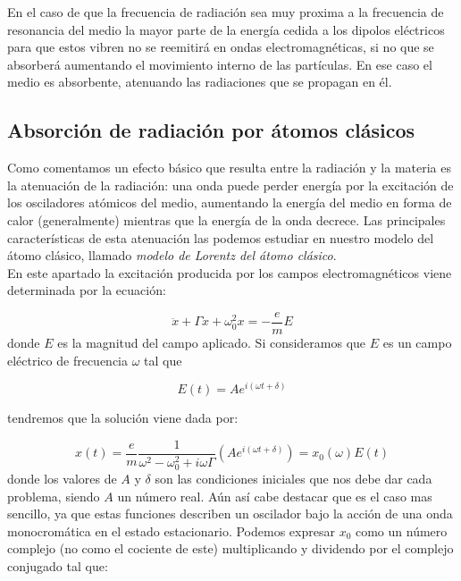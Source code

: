 \documentclass[12pt]{article}
\newcommand{\parentesis}[1]{\left( #1  \right)}
\numberwithin{equation}{section}
\numberwithin{figure}{section}
\begin{document}
En el caso de que la frecuencia de radiación sea muy proxima a la frecuencia de resonancia del medio la mayor parte de la energía cedida a los dipolos eléctricos para que estos vibren no se reemitirá en ondas electromagnéticas, si no que se absorberá aumentando el movimiento interno de las partículas. En ese caso el medio es absorbente, atenuando las radiaciones que se propagan en él.

\subsection{Absorción de radiación por átomos clásicos}

Como comentamos un efecto básico que resulta entre la radiación y la materia es la atenuación de la radiación: una onda puede perder energía por la excitación de los osciladores atómicos del medio, aumentando la energía del medio en forma de calor (generalmente) mientras que la energía de la onda decrece. Las principales características de esta atenuación las podemos estudiar en nuestro modelo del átomo clásico, llamado \textit{modelo de Lorentz del átomo clásico}. \\

En este apartado la excitación producida por los campos electromagnéticos viene determinada por la ecuación:

\begin{equation}
\ddot{x} +  \Gamma \dot{x} + \omega^2_0 x  = - \dfrac{e}{m} E
\end{equation}
donde $E$ es la magnitud del campo aplicado. Si consideramos que $E$ es un campo eléctrico de frecuencia $\omega$ tal que

\begin{equation}
E(t) = A e^{i( \omega t  + \delta)}
\end{equation}


tendremos que la solución viene dada por:

\begin{equation}
x (t) = \dfrac{e}{m}  \dfrac{1}{\omega^2-\omega^2_0 + i \omega \Gamma} \parentesis{A e^{i (\omega t+\delta)}} = x_0 (\omega) E(t) \label{Ec:7.3.0.12}
\end{equation}
donde los valores de $A$ y $\delta$ son las condiciones iniciales que nos debe dar cada problema, siendo $A$ un número real. Aún así cabe destacar que es el caso mas sencillo, ya que estas funciones describen un oscilador bajo la acción de una onda monocromática en el estado estacionario. Podemos expresar $x_0$ como un número complejo (no como el cociente de este) multiplicando y dividendo por el complejo conjugado tal que:
\end{document}
